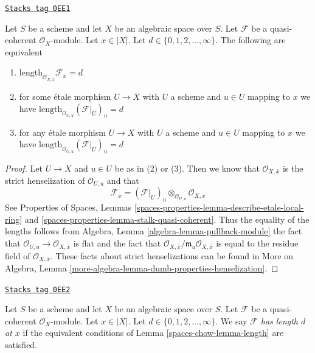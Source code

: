 \begin{lemma}[Length]
\label{spaces-chow-lemma-length}
\href{https://stacks.math.columbia.edu/tag/0EE1}{\texttt{Stacks tag 0EE1}}

Let $S$ be a scheme and let $X$ be an algebraic space over $S$.
Let $\mathcal{F}$ be a quasi-coherent $\mathcal{O}_X$-module.
Let $x \in |X|$. Let $d \in \{0, 1, 2, \ldots, \infty\}$.
The following are equivalent
\begin{enumerate}
\item
$\text{length}_{\mathcal{O}_{X, \overline{x}}} \mathcal{F}_{\overline{x}} = d$
\item for some \'etale morphism $U \to X$ with $U$ a scheme
and $u \in U$ mapping to $x$ we have
$\text{length}_{\mathcal{O}_{U, u}} (\mathcal{F}|_U)_u = d$
\item for any \'etale morphism $U \to X$ with $U$ a scheme
and $u \in U$ mapping to $x$ we have
$\text{length}_{\mathcal{O}_{U, u}} (\mathcal{F}|_U)_u = d$
\end{enumerate}
\end{lemma}

\begin{proof}
Let $U \to X$ and $u \in U$ be as in (2) or (3). Then we know that
$\mathcal{O}_{X, \overline{x}}$ is the strict henselization of
$\mathcal{O}_{U, u}$ and that
$$
\mathcal{F}_{\overline{x}} =
(\mathcal{F}|_U)_u \otimes_{\mathcal{O}_{U, u}} \mathcal{O}_{X, \overline{x}}
$$
See Properties of Spaces,
Lemmas \ref{spaces-properties-lemma-describe-etale-local-ring} and
\ref{spaces-properties-lemma-stalk-quasi-coherent}.
Thus the equality of the lengths follows from
Algebra, Lemma \ref{algebra-lemma-pullback-module}
the fact that $\mathcal{O}_{U, u} \to \mathcal{O}_{X, \overline{x}}$
is flat and the fact that
$\mathcal{O}_{X, \overline{x}}/\mathfrak m_u\mathcal{O}_{X, \overline{x}}$
is equal to the residue field of $\mathcal{O}_{X, \overline{x}}$.
These facts about strict henselizations can be found in
More on Algebra, Lemma \ref{more-algebra-lemma-dumb-properties-henselization}.
\end{proof}

\begin{definition}[Length at x]
\label{spaces-chow-definition-length-at-x}
\href{https://stacks.math.columbia.edu/tag/0EE2}{\texttt{Stacks tag 0EE2}}

Let $S$ be a scheme and let $X$ be an algebraic space over $S$.
Let $\mathcal{F}$ be a quasi-coherent $\mathcal{O}_X$-module.
Let $x \in |X|$. Let $d \in \{0, 1, 2, \ldots, \infty\}$.
We say {\it $\mathcal{F}$ has length $d$ at $x$}
if the equivalent conditions of Lemma \ref{spaces-chow-lemma-length}
are satisfied.
\end{definition}

